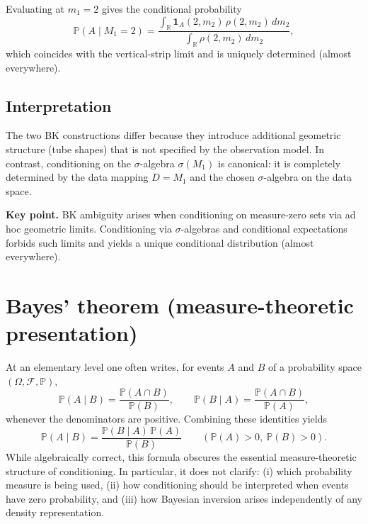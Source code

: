 \documentclass[11pt]{article}
\theoremstyle{remark}
\begin{document}
Evaluating at $m_1=2$ gives the conditional probability
\[
\mathbb P(A\mid M_1=2)
=
\frac{
\displaystyle\int_{\mathbb R}
\mathbf 1_A(2,m_2)\,\rho(2,m_2)\,dm_2
}{
\displaystyle\int_{\mathbb R}
\rho(2,m_2)\,dm_2
},
\]
which coincides with the vertical-strip limit and is uniquely determined
(almost everywhere).

\subsection{Interpretation}

The two BK constructions differ because they introduce additional geometric structure
(tube shapes) that is not specified by the observation model.
In contrast, conditioning on the $\sigma$-algebra $\sigma(M_1)$ is canonical:
it is completely determined by the data mapping $D=M_1$ and the chosen
$\sigma$-algebra on the data space.

\medskip

\noindent
\textbf{Key point.}
BK ambiguity arises when conditioning on measure-zero sets via ad hoc geometric
limits.
Conditioning via $\sigma$-algebras and conditional expectations forbids such limits
and yields a unique conditional distribution (almost everywhere).


\section{Bayes' theorem (measure-theoretic presentation)}

At an elementary level one often writes, for events \(A\) and \(B\) of a
probability space \((\Omega,\mathcal F,\mathbb P)\),
\begin{equation}\label{eq:elementary-bayes}
  \mathbb P(A\mid B)
  =
  \frac{\mathbb P(A\cap B)}{\mathbb P(B)},
  \qquad
  \mathbb P(B\mid A)
  =
  \frac{\mathbb P(A\cap B)}{\mathbb P(A)},
\end{equation}
whenever the denominators are positive. Combining these identities yields
\begin{equation}\label{eq:elementary-bayes-2}
  \mathbb P(A\mid B)
  =
  \frac{\mathbb P(B\mid A)\,\mathbb P(A)}{\mathbb P(B)}
  \qquad
  (\mathbb P(A)>0,\ \mathbb P(B)>0).
\end{equation}
While algebraically correct, this formula obscures the essential
measure-theoretic structure of conditioning. In particular, it does not
clarify:
(i) which probability measure is being used,
(ii) how conditioning should be interpreted when events have zero
probability, and
(iii) how Bayesian inversion arises independently of any density
representation.
\end{document}
